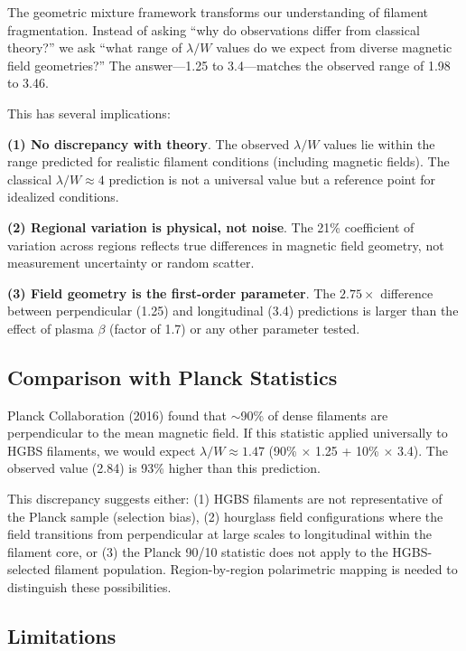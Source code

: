 \documentclass[twoside,twocolumn]{mnras}
\begin{document}
The geometric mixture framework transforms our understanding of filament fragmentation. Instead of asking ``why do observations differ from classical theory?'' we ask ``what range of $\lambda/W$ values do we expect from diverse magnetic field geometries?'' The answer---1.25 to 3.4---matches the observed range of 1.98 to 3.46.

This has several implications:

\textbf{(1) No discrepancy with theory}. The observed $\lambda/W$ values lie within the range predicted for realistic filament conditions (including magnetic fields). The classical $\lambda/W \approx 4$ prediction is not a universal value but a reference point for idealized conditions.

\textbf{(2) Regional variation is physical, not noise}. The 21\% coefficient of variation across regions reflects true differences in magnetic field geometry, not measurement uncertainty or random scatter.

\textbf{(3) Field geometry is the first-order parameter}. The $2.75\times$ difference between perpendicular (1.25) and longitudinal (3.4) predictions is larger than the effect of plasma $\beta$ (factor of 1.7) or any other parameter tested.

\subsection{Comparison with Planck Statistics}

Planck Collaboration (2016) found that $\sim$90\% of dense filaments are perpendicular to the mean magnetic field. If this statistic applied universally to HGBS filaments, we would expect $\lambda/W \approx 1.47$ (90\% $\times$ 1.25 + 10\% $\times$ 3.4). The observed value (2.84) is 93\% higher than this prediction.

This discrepancy suggests either: (1) HGBS filaments are not representative of the Planck sample (selection bias), (2) hourglass field configurations where the field transitions from perpendicular at large scales to longitudinal within the filament core, or (3) the Planck 90/10 statistic does not apply to the HGBS-selected filament population. Region-by-region polarimetric mapping is needed to distinguish these possibilities.

\subsection{Limitations}
\end{document}
